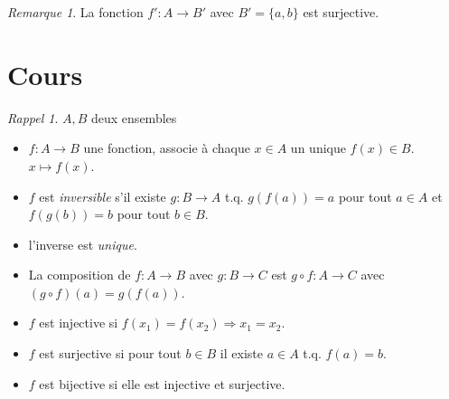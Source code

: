 \documentclass{report}
\newcounter{cours}
\newcommand*{\cours}{\section*{Cours \thecours}\stepcounter{cours}}
\theoremstyle{definition}
\theoremstyle{remark}
\newtheorem*{rema}{Remarque}
\newtheorem*{rappel}{Rappel}
\begin{document}
	\begin{rema}
		La fonction $f':A \to B'$ avec $B'=\{a,b\}$ est surjective.
	\end{rema}


	\cours
	\begin{rappel}
		$A, B$ deux ensembles

		\begin{itemize}[noitemsep]
			\item $f:A \to B$ une fonction, associe \`a chaque $x \in A$ un unique $f(x) \in B$. $x \mapsto f(x)$.
			\item $f$ est \emph{inversible} s'il existe $g:B \to A$ t.q. $g(f(a))=a$ pour tout $a \in A$ et $f(g(b))=b$ pour tout $b \in B$.
			\item l'inverse est \emph{unique}.
			\item La composition de $f:A \to B$ avec $g:B \to C$ est $g \circ f:A \to C$ avec $(g \circ f)(a)=g(f(a))$.
			\item $f$ est injective si $f(x_1)=f(x_2) \Rightarrow x_1=x_2$.
			\item $f$ est surjective si pour tout $b \in B$ il existe $a \in A$ t.q. $f(a)=b$.
			\item $f$ est bijective si elle est injective et surjective.
		\end{itemize}
	\end{rappel}
\end{document}
